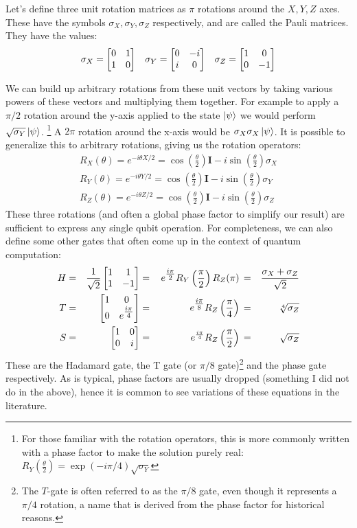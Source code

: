 Let's define three unit rotation matrices as $\pi$ rotations around the $X, Y, Z$ axes. These have the symbols
$\sigma_X, \sigma_Y, \sigma_Z$ respectively, and are called the Pauli matrices.
They have the values:
\begin{align}
  \sigma_X = \begin{bmatrix}0&1\\1&0\end{bmatrix} && \sigma_Y = \begin{bmatrix}0&-i\\i&0\end{bmatrix} && \sigma_Z = \begin{bmatrix}1&0\\0&-1\end{bmatrix}
  \label{eq:pauli}
\end{align}

We can build up arbitrary rotations from these unit vectors by taking various powers of these vectors
and multiplying them together. For example to apply a $\pi/2$ rotation around the y-axis applied to the state $\ket{\psi}$
we would perform $\sqrt{\sigma_Y}\ket{\psi}$. \footnote{For those familiar with the rotation operators,
this is more commonly written with a phase factor to make the solution purely real: $R_Y(\tfrac{\theta}{2})
= \exp(-i\pi/4)\sqrt{\sigma_Y}$}
A $2\pi$ rotation around the x-axis would be $\sigma_X\sigma_X\ket{\psi}$. It is possible to generalize this
to arbitrary rotations, giving us the rotation operators\cite{Nielsen:rot}:
\begin{align}
  R_X(\theta) = e^{-i \theta X/2} = \cos\left(\frac{\theta}{2}\right)\boldsymbol{I} - i \sin\left(\frac{\theta}{2}\right)\sigma_X \\
  R_Y(\theta) = e^{-i \theta Y/2} = \cos\left(\frac{\theta}{2}\right)\boldsymbol{I} - i \sin\left(\frac{\theta}{2}\right)\sigma_Y \\
  R_Z(\theta) = e^{-i \theta Z/2} = \cos\left(\frac{\theta}{2}\right)\boldsymbol{I} - i \sin\left(\frac{\theta}{2}\right)\sigma_Z
\end{align}
These three rotations (and often a global phase factor to simplify our result) are sufficient to express
any single qubit operation. For completeness, we can also define some other gates that often come up in
the context of quantum computation:
\begin{alignat}{4}
    H &=& \frac{1}{\sqrt{2}}\begin{bmatrix}1&1\\1&-1\end{bmatrix} &=& \, e^{\tfrac{i\pi}{2}} R_Y\left(\frac{\pi}{2}\right) R_Z(\pi) \, &=& \frac{\sigma_X+\sigma_Z}{\sqrt{2}} \\
    T &=& \begin{bmatrix}1&0\\0&e^{\tfrac{i\pi}{4}}\end{bmatrix}  &=& \, e^{\tfrac{i\pi}{8}} R_Z\left(\frac{\pi}{4}\right)          \, &=& \sqrt[4]{\sigma_Z} \\
    S &=& \begin{bmatrix}1&0\\0&i\end{bmatrix}                    &=& \, e^{\frac{i \pi}{4}} R_Z\left(\frac{\pi}{2}\right)          \, &=& \sqrt{\sigma_Z}
\end{alignat}
These are the Hadamard gate, the T gate (or $\pi/8$ gate)\footnote{The $T$-gate is often
referred to as the $\pi/8$ gate, even though it represents a $\pi/4$ rotation, a name that is derived from
the phase factor for historical reasons.} and the phase gate respectively.
As is typical, phase factors are usually dropped (something I did not do in the above), hence it is
common to see variations of these equations in the literature.

